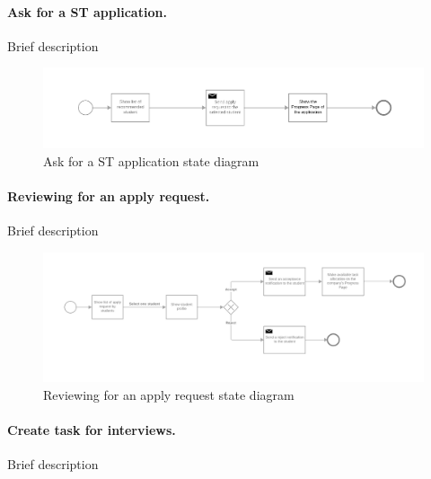 \paragraph{Ask for a ST application.}
Brief description

\begin{figure}[H]
    \begin{center}
        \includegraphics[width=1\linewidth]{RASD/LaTeX/Images/StateDiagrams/ask_for_a_ST_application.png}
        \caption{Ask for a ST application state diagram}
        \label{fig:ask_for_a_ST_application_sd}%
    \end{center}
\end{figure}

\paragraph{Reviewing for an apply request.}
Brief description

\begin{figure}[H]
    \begin{center}
        \includegraphics[width=1\linewidth]{RASD/LaTeX/Images/StateDiagrams/reviewing_an_apply_request.png}
        \caption{Reviewing for an apply request state diagram}
        \label{fig:reviewing_an_apply_request_sd}%
    \end{center}
\end{figure}

\paragraph{Create task for interviews.}
Brief description

